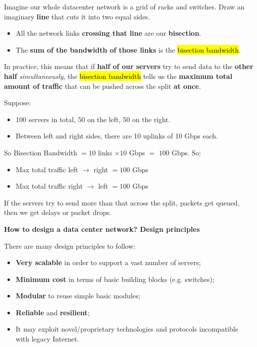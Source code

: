 \highspace
Imagine our whole datacenter network is a grid of racks and switches. Draw an imaginary \textbf{line} that cuts it into two equal sides.
\begin{itemize}
    \item All the network links \textbf{crossing that line} are our \textbf{bisection}.
    \item The \textbf{sum of the bandwidth of those links} is the \hl{bisection bandwidth}.
\end{itemize}
In practice, this means that if \textbf{half of our servers} try to send data to the \textbf{other half} \emph{simultaneously}, the \hl{bisection bandwidth} tells us the \textbf{maximum total amount of traffic} that can be pushed across the split \textbf{at once}.

\newpage

\begin{examplebox}
    Suppose:
    \begin{itemize}
        \item 100 servers in total, 50 on the left, 50 on the right.
        \item Between left and right sides, there are 10 uplinks of 10 Gbps each.
    \end{itemize}
    So Bisection Bandwidth $= 10$ links $\times 10$ Gbps $=$ $100$ Gbps. So:
    \begin{itemize}
        \item Max total traffic left $\to$ right $= 100$ Gbps
        \item Max total traffic right $\to$ left $= 100$ Gbps
    \end{itemize}
    If the servers try to send more than that across the split, packets get queued, then we get delays or packet drops.
\end{examplebox}

\highspace
\begin{flushleft}
    \textcolor{Green3}{ \textbf{How to design a data center network? Design principles}}
\end{flushleft}
There are many design principles to follow:
\begin{itemize}
    \item \textbf{Very scalable} in order to support a vast number of servers;
    \item \textbf{Minimum cost} in terms of basic building blocks (e.g. switches);
    \item \textbf{Modular} to reuse simple basic modules;
    \item \textbf{Reliable} and \textbf{resilient};
    \item It may exploit novel/proprietary technologies and protocols incompatible with legacy Internet.
\end{itemize}

